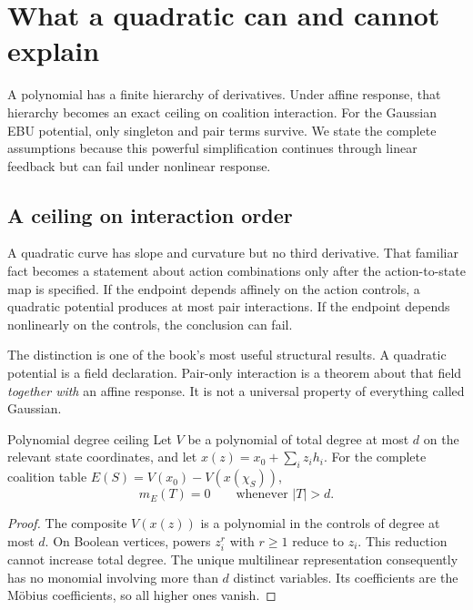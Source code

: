 \chapter{What a quadratic can and cannot explain}\label{ch:degree}

A polynomial has a finite hierarchy of derivatives. Under affine response, that hierarchy becomes an exact ceiling on coalition interaction. For the Gaussian EBU potential, only singleton and pair terms survive. We state the complete assumptions because this powerful simplification continues through linear feedback but can fail under nonlinear response.


\section{A ceiling on interaction order}
A quadratic curve has slope and curvature but no third derivative. That familiar fact becomes a statement about action combinations only after the action-to-state map is specified. If the endpoint depends affinely on the action controls, a quadratic potential produces at most pair interactions. If the endpoint depends nonlinearly on the controls, the conclusion can fail.

The distinction is one of the book's most useful structural results. A quadratic potential is a field declaration. Pair-only interaction is a theorem about that field \emph{together with} an affine response. It is not a universal property of everything called Gaussian.

\begin{theorem}{Polynomial degree ceiling}\label{thm:degree}
Let $V$ be a polynomial of total degree at most $d$ on the relevant state coordinates, and let $x(z)=x_0+\sum_i z_i h_i$. For the complete coalition table $E(S)=V(x_0)-V(x(\chi_S))$,
\begin{equation}
 m_E(T)=0\qquad\text{whenever }|T|>d.
\end{equation}
\end{theorem}
\begin{proof}
The composite $V(x(z))$ is a polynomial in the controls of degree at most $d$. On Boolean vertices, powers $z_i^r$ with $r\geq1$ reduce to $z_i$. This reduction cannot increase total degree. The unique multilinear representation consequently has no monomial involving more than $d$ distinct variables. Its coefficients are the Möbius coefficients, so all higher ones vanish.
\end{proof}

